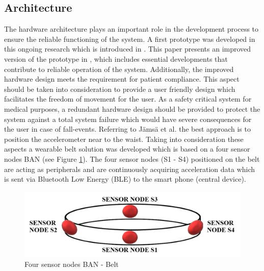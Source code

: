 \documentclass[review]{elsarticle}
\begin{document}
\subsection{Architecture}
\label{subsec:Architecture}	
The hardware architecture plays an important role in the development process to ensure the reliable functioning of the system. A first prototype was developed in this ongoing research which is introduced in \cite{LaBlunda.2016, LaBlunda.2016b}. This paper presents an improved version of the prototype in \cite{LaBlunda.2016, LaBlunda.2016b}, which includes essential developments that contribute to reliable operation of the system. Additionally, the improved hardware design meets the requirement for patient compliance. This aspect should be taken into consideration to provide a user friendly design which facilitates the freedom of movement for the user. As a safety critical system for medical purposes, a redundant hardware design should be provided to protect the system against a total system failure which would have severe consequences for the user in case of fall-events. Referring to J{\"a}ms{\"a} et al. \cite{jamsa2014fall} the best approach is to position the accelerometer near to the waist. Taking into consideration these aspects a wearable belt solution was developed which is based on a four sensor nodes BAN (see Figure \ref{fig:BanBelt}). The four sensor nodes (S1 - S4) positioned on the belt are acting as peripherals and are continuously acquiring acceleration data which is sent via Bluetooth Low Energy (BLE) to the smart phone (central device). 

\begin{figure}[!ht]
	\centering
	\includegraphics[scale=0.42]{Images/belt}
	\caption[Four sensor nodes BAN - Belt]{Four sensor nodes BAN - Belt \cite{LaBlunda.2016, LaBlunda.2016b}}
	\label{fig:BanBelt}
\end{figure}
\end{document}
